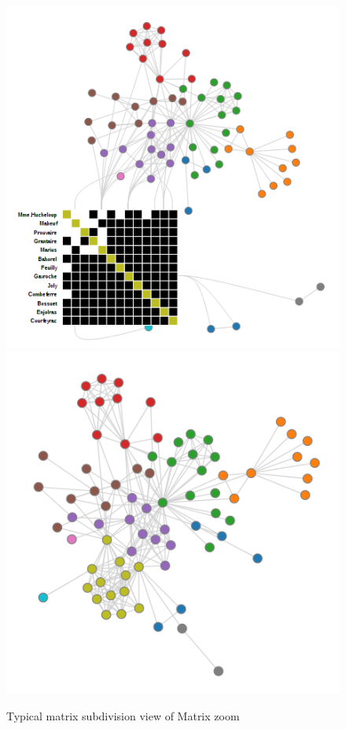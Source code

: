 \begin{figure}[h]
\centering
\includegraphics[width=\textwidth/3]{images/nodetrix_cluster}
\includegraphics[width=\textwidth/3]{images/nodetrix_matrix}
\caption{Typical matrix subdivision view of Matrix zoom\citep{henry-nodetrix-2007} \label{fig:nodetrix_cluster}}
\end{figure}
